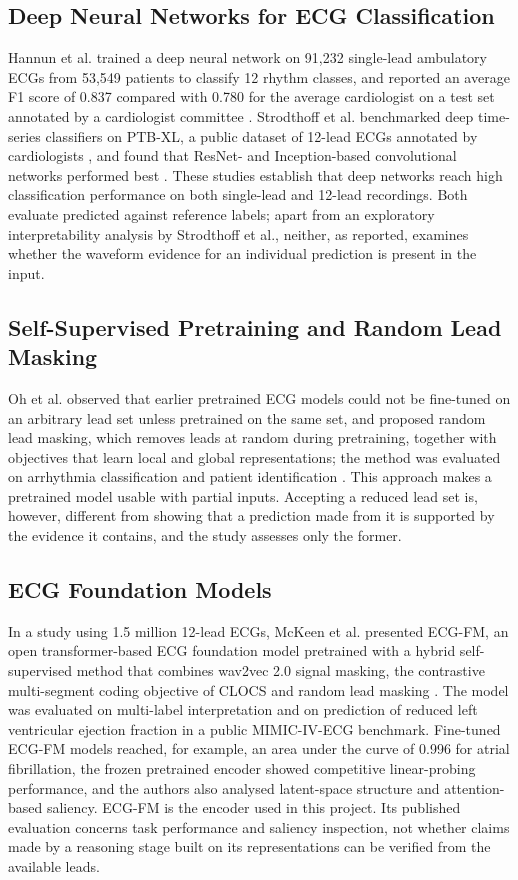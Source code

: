 \subsection*{Deep Neural Networks for ECG Classification}
Hannun et al. trained a deep neural network on 91,232 single-lead ambulatory ECGs from 53,549 patients to classify 12 rhythm classes, and reported an average F1 score of 0.837 compared with 0.780 for the average cardiologist on a test set annotated by a cardiologist committee \cite{HANNUN2019CARDIOLOGIST}. Strodthoff et al. benchmarked deep time-series classifiers on PTB-XL, a public dataset of 12-lead ECGs annotated by cardiologists \cite{WAGNER2020PTBXL}, and found that ResNet- and Inception-based convolutional networks performed best \cite{STRODTHOFF2021PTBXL}. These studies establish that deep networks reach high classification performance on both single-lead and 12-lead recordings. Both evaluate predicted against reference labels; apart from an exploratory interpretability analysis by Strodthoff et al., neither, as reported, examines whether the waveform evidence for an individual prediction is present in the input.

\subsection*{Self-Supervised Pretraining and Random Lead Masking}
Oh et al. observed that earlier pretrained ECG models could not be fine-tuned on an arbitrary lead set unless pretrained on the same set, and proposed random lead masking, which removes leads at random during pretraining, together with objectives that learn local and global representations; the method was evaluated on arrhythmia classification and patient identification \cite{OH2022LEADAGNOSTIC}. This approach makes a pretrained model usable with partial inputs. Accepting a reduced lead set is, however, different from showing that a prediction made from it is supported by the evidence it contains, and the study assesses only the former.

\subsection*{ECG Foundation Models}
In a study using 1.5 million 12-lead ECGs, McKeen et al. presented ECG-FM, an open transformer-based ECG foundation model pretrained with a hybrid self-supervised method that combines wav2vec 2.0 signal masking, the contrastive multi-segment coding objective of CLOCS and random lead masking \cite{MCKEEN2025ECGFM}. The model was evaluated on multi-label interpretation and on prediction of reduced left ventricular ejection fraction in a public MIMIC-IV-ECG benchmark. Fine-tuned ECG-FM models reached, for example, an area under the curve of 0.996 for atrial fibrillation, the frozen pretrained encoder showed competitive linear-probing performance, and the authors also analysed latent-space structure and attention-based saliency. ECG-FM is the encoder used in this project. Its published evaluation concerns task performance and saliency inspection, not whether claims made by a reasoning stage built on its representations can be verified from the available leads.


